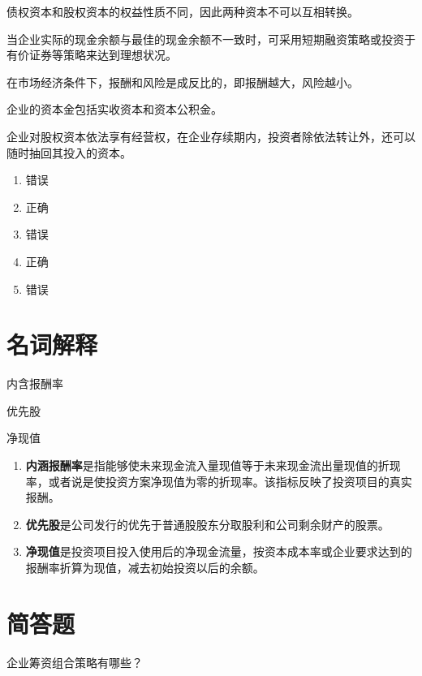 \documentclass[
  10pt,
  twoside,
  openany,
  b5paper, %
  colorscheme = black, %
  xits = false,
]{qyxf-book}
\begin{document}
 债权资本和股权资本的权益性质不同，因此两种资本不可以互相转换。

 当企业实际的现金余额与最佳的现金余额不一致时，可采用短期融资策略或投资于有价证券等策略来达到理想状况。

 在市场经济条件下，报酬和风险是成反比的，即报酬越大，风险越小。

 企业的资本金包括实收资本和资本公积金。

 企业对股权资本依法享有经营权，在企业存续期内，投资者除依法转让外，还可以随时抽回其投入的资本。

\begin{note}
	\begin{enumerate}
		\item 错误
		\item 正确
		\item 错误
		\item 正确
		\item 错误
	\end{enumerate}
\end{note}

\section{名词解释}

 内含报酬率

 优先股

 净现值

\begin{note}
	\begin{enumerate}
		\item \textbf{内涵报酬率}是指能够使未来现金流入量现值等于未来现金流出量现值的折现率，或者说是使投资方案净现值为零的折现率。该指标反映了投资项目的真实报酬。
		\item \textbf{优先股}是公司发行的优先于普通股股东分取股利和公司剩余财产的股票。
		\item \textbf{净现值}是投资项目投入使用后的净现金流量，按资本成本率或企业要求达到的报酬率折算为现值，减去初始投资以后的余额。
	\end{enumerate}
\end{note}

\newpage

\section{简答题}
 企业筹资组合策略有哪些？
\end{document}
